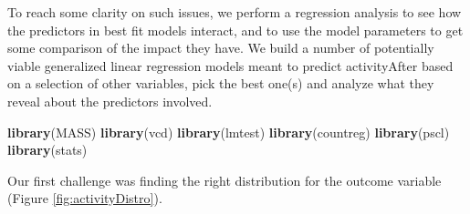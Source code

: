 \documentclass[10pt,]{scrartcl}
\newenvironment{Shaded}{\begin{snugshade}}{\end{snugshade}}
\newcommand{\KeywordTok}[1]{\textcolor[rgb]{0.13,0.29,0.53}{\textbf{#1}}}
\newcommand{\DataTypeTok}[1]{\textcolor[rgb]{0.13,0.29,0.53}{#1}}
\newcommand{\DecValTok}[1]{\textcolor[rgb]{0.00,0.00,0.81}{#1}}
\newcommand{\StringTok}[1]{\textcolor[rgb]{0.31,0.60,0.02}{#1}}
\newcommand{\OperatorTok}[1]{\textcolor[rgb]{0.81,0.36,0.00}{\textbf{#1}}}
\newcommand{\NormalTok}[1]{#1}
\begin{document}
To reach some clarity on such issues, we perform a regression analysis
to see how the predictors in best fit models interact, and to use the
model parameters to get some comparison of the impact they have. We
build a number of potentially viable generalized linear regression
models meant to predict \textsf{activityAfter} based on a selection of
other variables, pick the best one(s) and analyze what they reveal about
the predictors involved.

\footnotesize

\begin{Shaded}
\begin{Highlighting}[]
\KeywordTok{library}\NormalTok{(MASS)}
\KeywordTok{library}\NormalTok{(vcd)}
\KeywordTok{library}\NormalTok{(lmtest)}
\KeywordTok{library}\NormalTok{(countreg)}
\KeywordTok{library}\NormalTok{(pscl)}
\KeywordTok{library}\NormalTok{(stats)}
\end{Highlighting}
\end{Shaded}

\normalsize

Our first challenge was finding the right distribution for the outcome
variable (Figure \ref{fig:activityDistro}).

\footnotesize

\begin{Shaded}
\end{Shaded}
\end{document}
